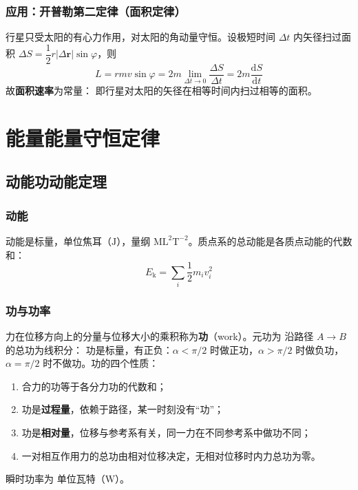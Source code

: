         \subsubsection{应用：开普勒第二定律（面积定律）}
        行星只受太阳的有心力作用，对太阳的角动量守恒。设极短时间 $\Delta t$ 内矢径扫过面积 $\Delta S=\dfrac{1}{2}r|\Delta\boldsymbol{r}|\sin\varphi$，则
        \[
        L=rmv\sin\varphi=2m\lim_{\Delta t\to0}\frac{\Delta S}{\Delta t}=2m\frac{\mathrm{d}S}{\mathrm{d}t}
        \]
        故\textbf{面积速率}为常量：
        即行星对太阳的矢径在相等时间内扫过相等的面积。

\section{能量\texorpdfstring{\hspace{0.5em}}{ }能量守恒定律}
    \subsection{动能\texorpdfstring{\hspace{0.5em}}{ }功\texorpdfstring{\hspace{0.5em}}{ }动能定理}
        \subsubsection{动能}
        动能是标量，单位焦耳（$\mathrm{J}$），量纲 $\mathrm{ML^{2}T^{-2}}$。质点系的总动能是各质点动能的代数和：
        \[
        E_{\mathrm{k}}=\sum_{i}\frac{1}{2}m_{i}v_{i}^{2}
        \]

        \subsubsection{功与功率}
        力在位移方向上的分量与位移大小的乘积称为\textbf{功}（work）。元功为
        沿路径 $A\to B$ 的总功为线积分：
        功是标量，有正负：$\alpha<\pi/2$ 时做正功，$\alpha>\pi/2$ 时做负功，$\alpha=\pi/2$ 时不做功。功的四个性质：
        \begin{enumerate}
            \item 合力的功等于各分力功的代数和；
            \item 功是\textbf{过程量}，依赖于路径，某一时刻没有“功”；
            \item 功是\textbf{相对量}，位移与参考系有关，同一力在不同参考系中做功不同；
            \item 一对相互作用力的总功由相对位移决定，无相对位移时内力总功为零。
        \end{enumerate}
        瞬时功率为
        单位瓦特（$\mathrm{W}$）。

